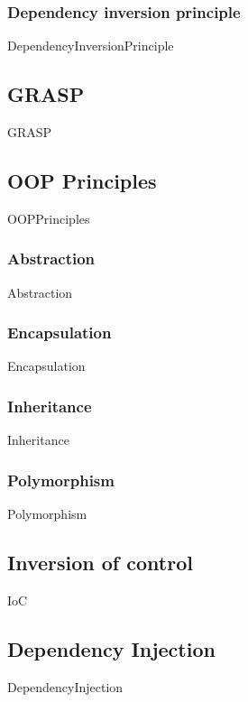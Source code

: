 \documentclass{article}
\begin{document}
        \subsubsection{Dependency inversion principle}
            {DependencyInversionPrinciple}

    \subsection{GRASP}
        {GRASP}

    \subsection{OOP Principles}
        {OOPPrinciples}

        \subsubsection{Abstraction}
            {Abstraction}

        \subsubsection{Encapsulation}
            {Encapsulation}

        \subsubsection{Inheritance}
            {Inheritance}

        \subsubsection{Polymorphism}
            {Polymorphism}
    \subsection{Inversion of control}
    \label{kap:IoC}
        {IoC}
    \subsection{Dependency Injection}
    \label{DependencyInjection}
        {DependencyInjection}
\end{document}
